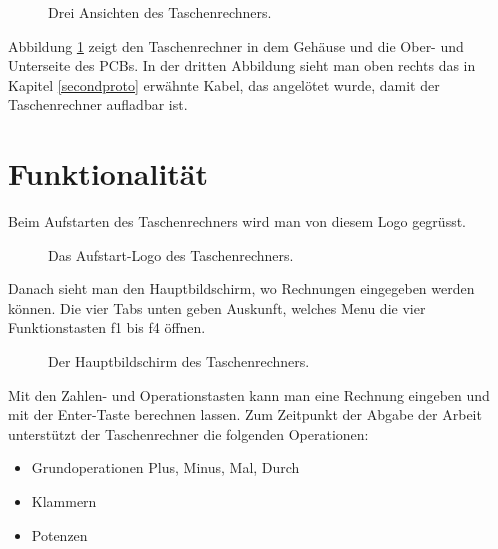 \documentclass[12pt, a4paper]{report}
\begin{document}
\begin{figure}[H]
\caption{Drei Ansichten des Taschenrechners.}
\label{fig:calcview}
\end{figure}

Abbildung \ref{fig:calcview} zeigt den Taschenrechner in dem Gehäuse und die Ober- und Unterseite des PCBs. In der dritten Abbildung sieht man oben rechts das in Kapitel \ref{secondproto} erwähnte Kabel, das angelötet wurde, damit der Taschenrechner aufladbar ist.

\newpage

\section{Funktionalität}
Beim Aufstarten des Taschenrechners wird man von diesem Logo gegrüsst.

\begin{figure}[H]
\centering
{}
\caption{Das Aufstart-Logo des Taschenrechners.}
\end{figure}

\noindent
Danach sieht man den Hauptbildschirm, wo Rechnungen eingegeben werden können. Die vier Tabs unten geben Auskunft, welches Menu die vier Funktionstasten f1 bis f4 öffnen.

\begin{figure}[H]
\centering
{}
\caption{Der Hauptbildschirm des Taschenrechners.}
\end{figure}

\noindent
Mit den Zahlen- und Operationstasten kann man eine Rechnung eingeben und mit der Enter-Taste berechnen lassen. Zum Zeitpunkt der Abgabe der Arbeit unterstützt der Taschenrechner die folgenden Operationen:
\\
\begin{itemize}
\item Grundoperationen Plus, Minus, Mal, Durch
\item Klammern
\item Potenzen
\end{itemize}
\end{document}
